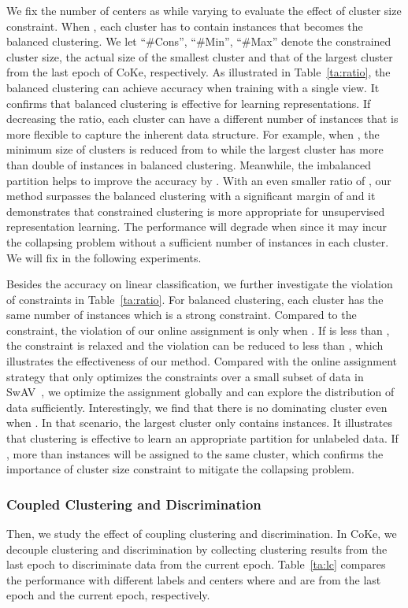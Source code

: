 \documentclass[10pt,twocolumn,letterpaper]{article}
\begin{document}
We fix the number of centers as  while varying  to evaluate the effect of cluster size constraint. When , each cluster has to contain  instances that becomes the balanced clustering. We let ``\#Cons'', ``\#Min'', ``\#Max'' denote the constrained cluster size, the actual size of the smallest cluster and that of the largest cluster from the last epoch of CoKe, respectively. As illustrated in Table~\ref{ta:ratio}, the balanced clustering can achieve  accuracy when training with a single view. It confirms that balanced clustering is effective for learning representations. If decreasing the ratio, each cluster can have a different number of instances that is more flexible to capture the inherent data structure. For example, when , the minimum size of clusters is reduced from  to  while the largest cluster has more than double of instances in balanced clustering. Meanwhile, the imbalanced partition helps to improve the accuracy by . With an even smaller ratio of , our method surpasses the balanced clustering with a significant margin of  and it demonstrates that constrained clustering is more appropriate for unsupervised representation learning. The performance will degrade when  since it may incur the collapsing problem without a sufficient number of instances in each cluster. We will fix  in the following experiments.  

Besides the accuracy on linear classification, we further investigate the violation of constraints in Table~\ref{ta:ratio}. For balanced clustering, each cluster has the same number of instances which is a strong constraint. Compared to the constraint, the violation of our online assignment is only  when . If  is less than , the constraint is relaxed and the violation can be reduced to less than , which illustrates the effectiveness of our method. Compared with the online assignment strategy that only optimizes the constraints over a small subset of data in SwAV~\cite{CaronMMGBJ20}, we optimize the assignment globally and can explore the distribution of data sufficiently. Interestingly, we find that there is no dominating cluster even when . In that scenario, the largest cluster only contains  instances. It illustrates that clustering is effective to learn an appropriate partition for unlabeled data. If , more than  instances will be assigned to the same cluster, which confirms the importance of cluster size constraint to mitigate the collapsing problem. 


\subsubsection{Coupled Clustering and Discrimination}
Then, we study the effect of coupling clustering and discrimination. In CoKe, we decouple clustering and discrimination by collecting clustering results from the last epoch to discriminate data from the current epoch. Table~\ref{ta:lc} compares the performance with different labels and centers where  and  are from the last epoch and the current epoch, respectively.
\end{document}
